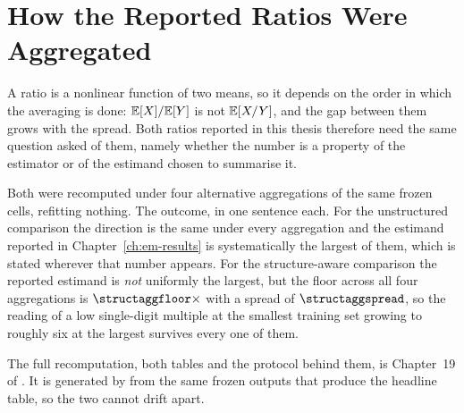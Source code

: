 %

\chapter{How the Reported Ratios Were Aggregated}\label{app:aggregation-chapter}
\label{app:aggregation}

A ratio is a nonlinear function of two means, so it depends on the order in
which the averaging is done: $\mathbb{E}[X]/\mathbb{E}[Y]$ is not $\mathbb{E}[X/Y]$, and the gap
between them grows with the spread. Both ratios reported in this thesis
therefore need the same question asked of them, namely whether the number is a
property of the estimator or of the estimand chosen to summarise it.

Both were recomputed under four alternative aggregations of the same frozen
cells, refitting nothing. The outcome, in one sentence each. For the
unstructured comparison the direction is the same under every aggregation and
the estimand reported in Chapter~\ref{ch:em-results} is systematically the
largest of them, which is stated wherever that number appears. For the
structure-aware comparison the reported estimand is \emph{not} uniformly the
largest, but the floor across all four aggregations is
$\structaggfloor\times$ with a spread of $\structaggspread$, so the reading of
a low single-digit multiple at the smallest training set growing to roughly six
at the largest survives every one of them.

The full recomputation, both tables and the protocol behind them, is
Chapter~19 of \compendium{}. It is generated by
 from the same frozen outputs
that produce the headline table, so the two cannot drift apart.

